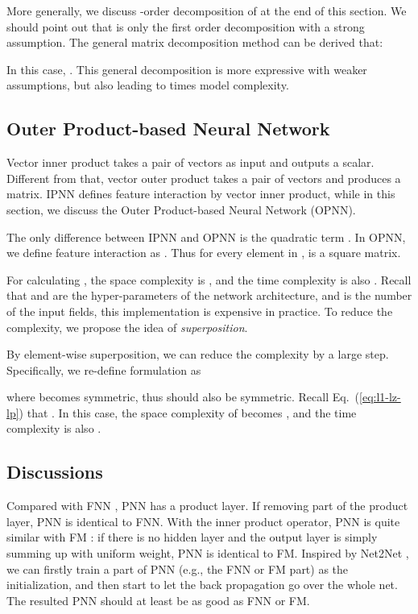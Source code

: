 \documentclass[conference]{IEEEtran}
\begin{document}
More generally, we discuss -order decomposition of  at the end of this section. We should point out that  is only the first order decomposition with a strong assumption. The general matrix decomposition method can be derived that:

In this case, . This general decomposition is more expressive with weaker assumptions, but also leading to  times model complexity.


\subsection{Outer Product-based Neural Network}\label{sec:pnn-ii}
Vector inner product takes a pair of vectors as input and outputs a scalar. Different from that, vector outer product takes a pair of vectors and produces a matrix. IPNN defines feature interaction by vector inner product, while in this section, we discuss the Outer Product-based Neural Network (OPNN).


The only difference between IPNN and OPNN is the quadratic term .
In OPNN, we define feature interaction as . Thus for every element in ,  is a square matrix.

For calculating , the space complexity is  , and the time complexity is also . Recall that  and  are the hyper-parameters of the network architecture, and  is the number of the input fields, this implementation is expensive in practice. To reduce the complexity, we propose the idea of \emph{superposition}.

By element-wise superposition, we can reduce the complexity by a large step. Specifically, we re-define  formulation as

where  becomes symmetric, thus  should also be symmetric.
Recall Eq.~(\ref{eq:l1-lz-lp}) that . In this case, the space complexity of  becomes , and the time complexity is also .





\subsection{Discussions}\label{sec:general-pnn}






Compared with FNN \cite{zhang2016deep}, PNN has a product layer. If removing  part of the product layer, PNN is identical to FNN. With the inner product operator, PNN is quite similar with FM \cite{rendle2010factorization}: if there is no hidden layer and the output layer is simply summing up with uniform weight, PNN is identical to FM. Inspired by Net2Net \cite{chen2015net2net}, we can firstly train a part of PNN (e.g., the FNN or FM part) as the initialization, and then start to let the back propagation go over the whole net. The resulted PNN should at least be as good as FNN or FM.
\end{document}
